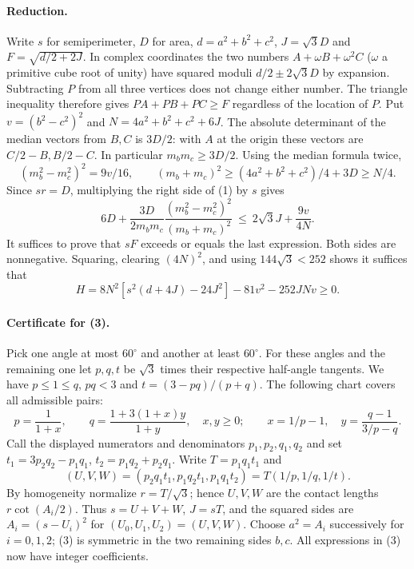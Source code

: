 \documentclass[11pt,a4paper]{article}
\numberwithin{equation}{section}
\theoremstyle{definition}
\theoremstyle{remark}
\begin{document}
\paragraph{Reduction.} Write $s$ for semiperimeter, $D$ for area, $d=a^2+b^2+c^2$, $J=\sqrt3D$ and $F=\sqrt{d/2+2J}$. In complex coordinates the two numbers $A+\omega B+\omega^2 C$ ($\omega$ a primitive cube root of unity) have squared moduli $d/2\pm2\sqrt3D$ by expansion. Subtracting $P$ from all three vertices does not change either number. The triangle inequality therefore gives $PA+PB+PC\ge F$ regardless of the location of $P$.
Put $v=(b^2-c^2)^2$ and $N=4a^2+b^2+c^2+6J$. The absolute determinant of the median vectors from $B,C$ is $3D/2$: with $A$ at the origin these vectors are $C/2-B,B/2-C$. In particular $m_bm_c\ge3D/2$. Using the median formula twice,
\[
 (m_b^2-m_c^2)^2=9v/16,\qquad
 (m_b+m_c)^2\ge (4a^2+b^2+c^2)/4+3D\ge N/4 .
\]
Since $sr=D$, multiplying the right side of (1) by $s$ gives
\[
 6D+\frac{3D}{2m_bm_c}\frac{(m_b^2-m_c^2)^2}{(m_b+m_c)^2}
 \ \le\ 2\sqrt3J+\frac{9v}{4N}. \tag{2}
\]
It suffices to prove that $sF$ exceeds or equals the last expression. Both sides are nonnegative. Squaring, clearing $(4N)^2$, and using $144\sqrt3<252$ shows it suffices that
\[
 H=8N^2[s^2(d+4J)-24J^2]-81v^2-252JNv\ge0. \tag{3}
\]
\paragraph{Certificate for (3).} Pick one angle at most $60^\circ$ and another at least $60^\circ$. For these angles and the remaining one let $p,q,t$ be $\sqrt3$ times their respective half-angle tangents. We have $p\le1\le q$, $pq<3$ and $t=(3-pq)/(p+q)$. The following chart covers all admissible pairs:
\[
 p=\frac1{1+x},\qquad q=\frac{1+3(1+x)y}{1+y},\quad x,y\ge0;
 \qquad x=1/p-1,\quad y=\frac{q-1}{3/p-q}.
\]
Call the displayed numerators and denominators $p_1,p_2,q_1,q_2$ and set $t_1=3p_2q_2-p_1q_1$, $t_2=p_1q_2+p_2q_1$. Write $T=p_1q_1t_1$ and
\[
 (U,V,W)=(p_2q_1t_1,p_1q_2t_1,p_1q_1t_2)=T(1/p,1/q,1/t).
\]
By homogeneity normalize $r=T/\sqrt3$; hence $U,V,W$ are the contact lengths $r\cot(A_i/2)$. Thus $s=U+V+W$, $J=sT$, and the squared sides are
$A_i=(s-U_i)^2$ for $(U_0,U_1,U_2)=(U,V,W)$. Choose $a^2=A_i$ successively for $i=0,1,2$; (3) is symmetric in the two remaining sides $b,c$. All expressions in (3) now have integer coefficients.
\end{document}

